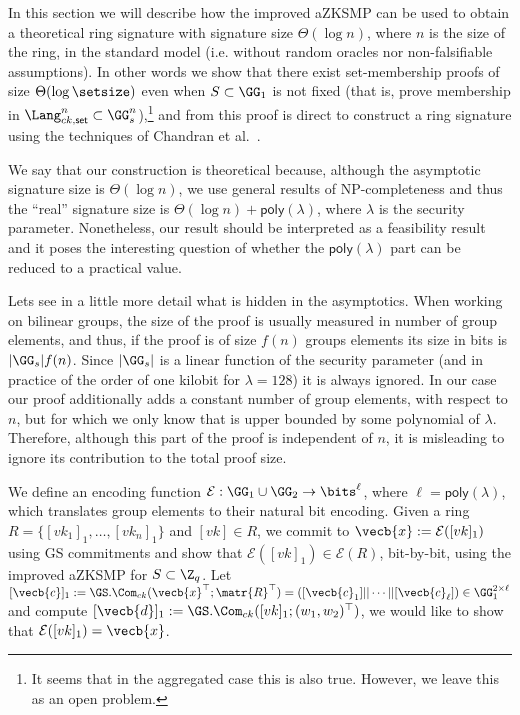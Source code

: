 In this section we will describe how the improved aZKSMP can be used to obtain a {theoretical} ring signature with signature size \(\Theta(\log n)\), where \(n\) is the size of the ring, in the standard model (i.e. without {random oracles} nor {non-falsifiable  assumptions}). In other words we show that there exist set-membership proofs of size \(\Theta(\log \setsize )\) even when \(S\subset \GG_1\) is not fixed (that is, prove membership in $\Lang_{ck,\mathsf{set}}^n\subset\GG_s^n$),\footnote{It seems that in the aggregated case this is also true. However, we leave this as an open problem.} and from this proof is direct to construct a ring signature using the techniques of Chandran et al.~\cite{ICALP:ChaGroSah07}.

We say that our construction is theoretical because, although the asymptotic signature size is \(\Theta(\log n)\), we use general results of NP-completeness and thus the ``real'' signature size is \(\Theta(\log n)+\mathsf{poly}(\lambda)\), where \(\lambda\) is the security parameter. Nonetheless, our result should be interpreted as a feasibility result and it poses the interesting question of whether the \(\mathsf{poly}(\lambda)\) part can be reduced to a practical value.

Lets see in a little more detail what is hidden in the asymptotics. When working on bilinear groups, the size of the proof is usually measured in number of group elements, and thus, if the proof is of size $f(n)$ groups elements its size in bits is $|\GG_s|f(n)$. Since $|\GG_s|$ is a linear function of the security parameter (and in practice of the order of one kilobit for $\lambda=128$) it is always ignored. In our case our proof additionally adds a constant number of group elements, with respect to $n$, but for which we only know that is upper bounded by some polynomial of $\lambda$. Therefore, although this part of the proof is independent of $n$, it is misleading to ignore its contribution to the total proof size.
 
We define an encoding function \(\mathcal{E}:\GG_1\cup\GG_2\to\bits^\ell\), where \(\ell=\mathsf{poly}(\lambda)\), which translates group elements to their natural bit encoding. Given a ring \(R=\{[vk_1]_1,\ldots,[vk_n]_1\}\) and \([vk]\in R\), we commit to \(\vecb{x}:=\mathcal{E}([vk]_1)\) using GS commitments and show that \(\mathcal{E}([vk]_1)\in\mathcal{E}(R)\), bit-by-bit, using the improved aZKSMP for \(S\subset \Z_q\). Let \([\vecb{c}]_1:=\GS.\Com_{ck}(\vecb{x}^\top;\matr{R}^\top)=([\vecb{c}_1]||\cdots||[\vecb{c}_\ell])\in\GG_1^{2\times \ell}\) and compute \([\vecb{d}]_1:=\GS.\Com_{ck}([vk]_1;(w_1,w_2)^\top)\), we would like to show that \(\mathcal{E}([vk]_1)=\vecb{x}\).

